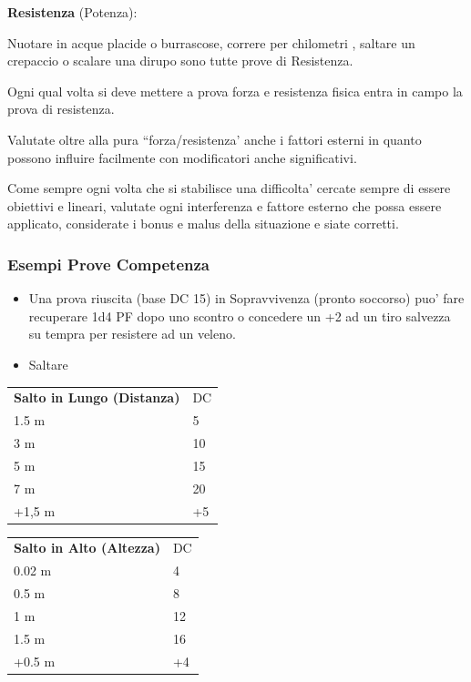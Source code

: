 \documentclass[a4paper,11pt,twoside,openany]{dndbook}
\begin{document}
\textbf{Resistenza} (Potenza):

Nuotare in acque placide o burrascose, correre per chilometri , saltare un crepaccio o scalare una dirupo sono tutte prove di Resistenza.

Ogni qual volta si deve mettere a prova forza e resistenza fisica entra in campo la prova di resistenza.

Valutate oltre alla pura ``forza/resistenza' anche i fattori esterni in quanto possono influire facilmente con modificatori anche significativi.

\bigskip

Come sempre ogni volta che si stabilisce una difficolta' cercate sempre di essere obiettivi e lineari, valutate ogni interferenza e fattore esterno che possa essere applicato, considerate i bonus e malus della situazione e siate corretti.

\subsubsection{Esempi Prove Competenza}

\label{esempi-prove-competenza}

\begin{itemize}
	\item Una prova riuscita (base DC 15) in Sopravvivenza (pronto soccorso) puo' fare recuperare 1d4 PF dopo uno scontro o concedere un +2 ad un tiro salvezza su tempra per resistere ad un veleno.
\end{itemize}

\begin{itemize}
	\item Saltare	
\end{itemize}


\begin{tabular}[c]{@{}ll@{}}
\toprule 
\textbf{Salto in Lungo (Distanza)} & DC\tabularnewline
1.5 m & 5\tabularnewline
3 m & 10\tabularnewline
5 m & 15\tabularnewline
7 m & 20\tabularnewline
+1,5 m & +5\tabularnewline
\bottomrule
\end{tabular}
\bigskip

\begin{tabular}[c]{@{}ll@{}}
	\toprule 
\textbf{	Salto in Alto (Altezza)} & DC\tabularnewline
	0.02 m & 4\tabularnewline
	0.5 m & 8\tabularnewline
	1 m & 12\tabularnewline
	1.5 m & 16\tabularnewline
	+0.5 m & +4\tabularnewline
	\bottomrule
\end{tabular}
\end{document}
